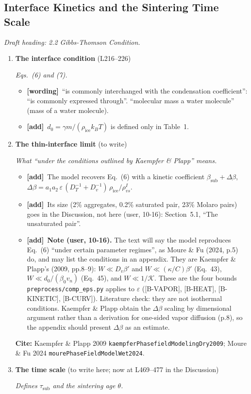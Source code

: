 \documentclass[11pt]{article}
\newcommand{\Cite}[1]{\par{\footnotesize\raggedright\textcolor{have}{\textbf{Cite:}} #1\par}}
\newcommand{\Pg}[3]{\item \textbf{#1} {\small(#2)}\par\textit{#3}}
\newcommand{\tG}{\textcolor{stale}{\textbf{[wording]}}\ }
\newcommand{\tA}{\textcolor{have}{\textbf{[add]}}\ }
\begin{document}
\subsection{Interface Kinetics and the Sintering Time Scale}
\textit{Draft heading: 2.2 Gibbs-Thomson Condition.}
\begin{enumerate}
\Pg{The interface condition}{L216--226}{Eqs.~(6) and (7).}
  \begin{itemize}
  \item \tG ``is commonly interchanged with the condensation coefficient'':
    ``is commonly expressed through''. ``molecular mass a water molecule''
    (mass of a water molecule).
  \item \tA $d_0 = \gamma m/(\rho_{\mathrm{ice}} k_B T)$ is defined only in
    Table~1.
  \end{itemize}
\Pg{The thin-interface limit}{to write}{What ``under the conditions outlined by Kaempfer \& Plapp'' means.}
  \begin{itemize}
  \item \tA The model recovers Eq.~(6) with a kinetic coefficient
    $\beta_{\mathrm{sub}} + \Delta\beta$, $\Delta\beta = a_1 a_2\,
    \varepsilon\,(D_T^{-1} + D_v^{-1})\,\rho_{\mathrm{ice}}/\rho_{vs}^{I}$.
  \item \tA Its size (2\% aggregates, 0.2\% saturated pair, 23\% Molaro
    pairs) goes in the Discussion, not here (user, 10-16): Section~5.1,
    ``The unsaturated pair''.
  \item \tA \textbf{Note (user, 10-16).} The text will say the model
    reproduces Eq.~(6) ``under certain parameter regimes'', as Moure \& Fu
    (2024, p.5) do, and may list the conditions in an appendix. They are
    Kaempfer \& Plapp's (2009, pp.8--9): $W \ll D_v\beta'$ and $W \ll
    (\kappa/C)\beta'$ (Eq.~43), $W \ll d_0/(\beta_0 v_n)$ (Eq.~45), and $W
    \ll 1/\mathcal{K}$. These are the four bounds \texttt{preprocess/comp\_eps.py}
    applies to $\varepsilon$ ([B-VAPOR], [B-HEAT], [B-KINETIC], [B-CURV]).
    Literature check: they are not isothermal conditions. Kaempfer \& Plapp
    obtain the $\Delta\beta$ scaling by dimensional argument rather than a
    derivation for one-sided vapor diffusion (p.8), so the appendix should
    present $\Delta\beta$ as an estimate.
  \end{itemize}
  \Cite{Kaempfer \& Plapp 2009 \texttt{kaempferPhasefieldModelingDry2009}; Moure \& Fu 2024 \texttt{mourePhaseFieldModelWet2024}.}
\Pg{The time scale}{to write here; now at L469--477 in the Discussion}{Defines $\tau_{\mathrm{sub}}$ and the sintering age $\theta$.}

\end{enumerate}
\end{document}
